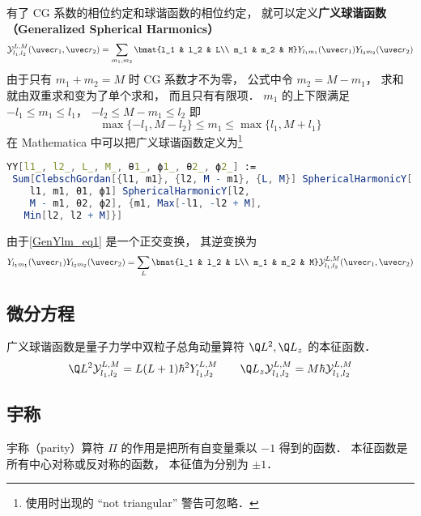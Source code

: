 
有了 CG 系数的相位约定和球谐函数的相位约定， 就可以定义\textbf{广义球谐函数（Generalized Spherical Harmonics）}
\begin{equation}\label{GenYlm_eq1}
\mathcal{Y}_{l_1,l_2}^{L,M}(\uvec r_1, \uvec r_2) = \sum_{m_1, m_2} \bmat{l_1 & l_2 & L\\ m_1 & m_2 & M} Y_{l_1 m_1}(\uvec r_1) Y_{l_2 m_2} (\uvec r_2)
\end{equation}
由于只有 $m_1 + m_2 = M$ 时 CG 系数才不为零， 公式中令 $m_2 = M - m_1$， 求和就由双重求和变为了单个求和， 而且只有有限项． $m_1$ 的上下限满足 $-l_1 \leqslant m_1 \leqslant l_1$， $-l_2 \leqslant M-m_1 \leqslant l_2$ 即
\begin{equation}
\max\{-l_1, M-l_2\} \leqslant m_1 \leqslant \max\{l_1, M+l_1\}
\end{equation}
在 Mathematica 中可以把广义球谐函数定义为\footnote{使用时出现的 “not triangular” 警告可忽略．}
\begin{lstlisting}[language=Mathematica]
YY[l1_, l2_, L_, M_, θ1_, ϕ1_, θ2_, ϕ2_] := 
 Sum[ClebschGordan[{l1, m1}, {l2, M - m1}, {L, M}] SphericalHarmonicY[
    l1, m1, θ1, ϕ1] SphericalHarmonicY[l2, 
    M - m1, θ2, ϕ2], {m1, Max[-l1, -l2 + M], 
   Min[l2, l2 + M]}]
\end{lstlisting}

由于\autoref{GenYlm_eq1} 是一个正交变换， 其逆变换为
\begin{equation}
Y_{l_1 m_1}(\uvec r_1) Y_{l_2 m_2} (\uvec r_2) = \sum_{L} \bmat{l_1 & l_2 & L\\ m_1 & m_2 & M} \mathcal{Y}_{l_1,l_2}^{L,M}(\uvec r_1, \uvec r_2)
\end{equation}

\subsection{微分方程}
广义球谐函数是量子力学中双粒子总角动量算符 $\Q L^2, \Q L_z$ 的本征函数．
\begin{equation}
\Q L^2 \mathcal Y_{l_1,l_2}^{L,M} = L(L+1) \hbar^2 Y_{l_1,l_2}^{L,M}
\qquad
\Q L_z \mathcal Y_{l_1,l_2}^{L,M} = M\hbar \mathcal Y_{l_1,l_2}^{L,M}
\end{equation}


\subsection{宇称}
宇称（parity）算符 $\Pi$ 的作用是把所有自变量乘以 $-1$ 得到的函数． 本征函数是所有中心对称或反对称的函数， 本征值为分别为 $\pm 1$．

